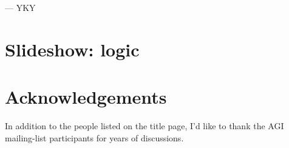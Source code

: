 \documentclass[12pt, a4paper]{report}
\begin{document}
\begin{flushright}
--- YKY
\end{flushright}




\chapter{Slideshow: logic}


















{}
\chapter*{Acknowledgements}

In addition to the people listed on the title page, I'd like to thank the AGI mailing-list participants for years of discussions.

\clearpage
{}
{}

\end{document}
